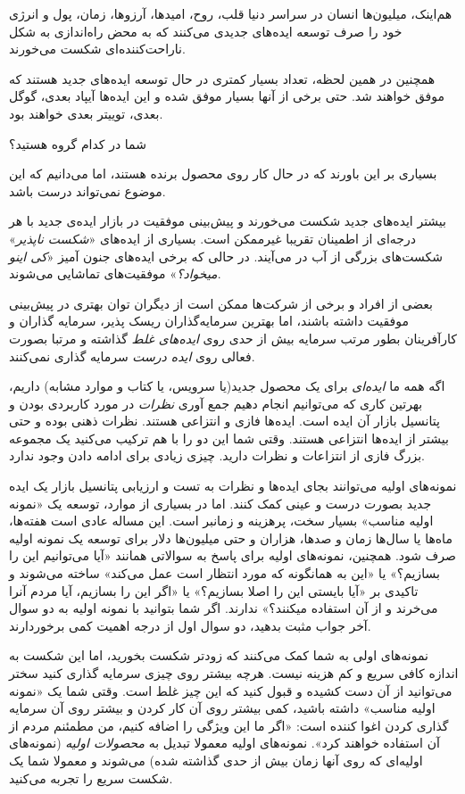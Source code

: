 هم‌اینک، میلیون‌ها انسان در سراسر دنیا قلب، روح، امیدها، آرزوها، زمان،
پول و انرژی خود را صرف توسعه ایده‌های جدیدی می‌کنند که به محض راه‌اندازی
به شکل ناراحت‌کننده‌ای شکست می‌خورند.

همچنین در همین لحظه، تعداد بسیار کمتری در حال توسعه ایده‌های جدید هستند
که موفق خواهند شد. حتی برخی از آنها بسیار موفق شده و این ایده‌ها آیپاد
بعدی، گوگل بعدی، توییتر بعدی خواهند بود.

شما در کدام گروه هستید؟

بسیاری بر این باورند که در حال کار روی محصول برنده هستند، اما می‌دانیم
که این موضوع نمی‌تواند درست باشد.

بیشتر ایده‌های جدید شکست می‌خورند و پیش‌بینی موفقیت در بازار ایده‌ی جدید
با هر درجه‌ای از اطمینان تقریبا غیرممکن است. بسیاری از ایده‌های
«\emph{شکست ناپذیر}» شکست‌های بزرگی از آب در می‌آیند. در حالی که برخی
ایده‌های جنون آمیز «\emph{کی اینو میخواد؟}» موفقیت‌های تماشایی می‌شوند.

بعضی از افراد و برخی از شرکت‌ها ممکن است از دیگران توان بهتری در
پیش‌بینی موفقیت داشته باشند، اما بهترین سرمایه‌گذاران ریسک پذیر، سرمایه
گذاران و کارآفرینان بطور مرتب سرمایه بیش از حدی روی \emph{ایده‌های غلط}
گذاشته و مرتبا بصورت فعالی روی \emph{ایده درست} سرمایه گذاری نمی‌کنند.

اگه همه ما \emph{ایده‌ای} برای یک محصول جدید(یا سرویس، یا کتاب و موارد
مشابه) داریم، بهرتین کاری که می‌توانیم انجام دهیم جمع آوری \emph{نظرات}
در مورد کاربردی بودن و پتانسیل بازار آن ایده است. ایده‌ها فازی و انتزاعی
هستند. نظرات ذهنی بوده و حتی بیشتر از ایده‌ها انتزاعی هستند. وقتی شما
این دو را با هم ترکیب می‌کنید یک مجموعه بزرگ فازی از انتزاعات و نظرات
دارید. چیزی زیادی برای ادامه دادن وجود ندارد.

نمونه‌های اولیه می‌توانند بجای ایده‌ها و نظرات به تست و ارزیابی پتانسیل
بازار یک ایده جدید بصورت درست و عینی کمک کنند. اما در بسیاری از موارد،
توسعه یک «نمونه اولیه مناسب» بسیار سخت، پرهزینه و زمانبر است. این مساله
عادی است هفته‌ها، ماه‌ها یا سال‌ها زمان و صدها، هزاران و حتی میلیون‌ها
دلار برای توسعه یک نمونه اولیه صرف شود. همچنین، نمونه‌های اولیه برای
پاسخ به سوالاتی همانند «آیا می‌توانیم این را بسازیم؟» یا «این به
همانگونه که مورد انتظار است عمل می‌کند» ساخته می‌شوند و تاکیدی بر «آیا
بایستی این را اصلا بسازیم؟» یا «اگر این را بسازیم، آیا مردم آنرا می‌خرند
و از آن استفاده میکنند؟» ندارند. اگر شما بتوانید با نمونه اولیه به دو
سوال آخر جواب مثبت بدهید، دو سوال اول از درجه اهمیت کمی برخوردارند.

نمونه‌های اولی به شما کمک می‌کنند که زودتر شکست بخورید، اما این شکست به
اندازه کافی سریع و کم هزینه نیست. هرچه بیشتر روی چیزی سرمایه گذاری کنید
سختر می‌توانید از آن دست کشیده و قبول کنید که این چیز غلط است. وقتی شما
یک «نمونه اولیه مناسب» داشته باشید، کمی بیشتر روی آن کار کردن و بیشتر
روی آن سرمایه گذاری کردن اغوا کننده است: «اگر ما این ویژگی را اضافه
کنیم، من مطمئنم مردم از آن استفاده خواهند کرد». نمونه‌های اولیه معمولا
تبدیل به \emph{محصولات اولیه} (نمونه‌های اولیه‌ای که روی آنها زمان بیش
از حدی گذاشته شده) می‌شوند و معمولا شما یک شکست سریع را تجربه می‌کنید.

